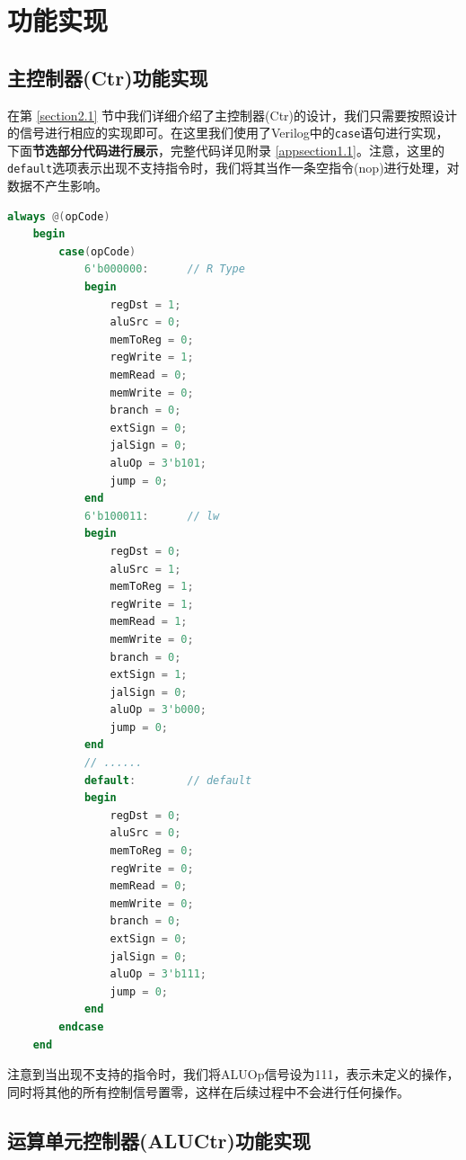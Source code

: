 \documentclass{cumcm}
\numberwithin{equation}{section}
\numberwithin{equation}{subsection}
\begin{document}
\section{功能实现}\label{section3}
\subsection{主控制器(Ctr)功能实现}\label{section3.1}

在第 \ref{section2.1} 节中我们详细介绍了主控制器(Ctr)的设计，我们只需要按照设计的信号进行相应的实现即可。在这里我们使用了Verilog中的\texttt{case}语句进行实现，下面\textbf{节选部分代码进行展示}，完整代码详见附录 \ref{appsection1.1}。注意，这里的\texttt{default}选项表示出现不支持指令时，我们将其当作一条空指令(nop)进行处理，对数据不产生影响。

\begin{lstlisting}[language=verilog]
always @(opCode)
    begin
        case(opCode)
            6'b000000:      // R Type
            begin
                regDst = 1;
                aluSrc = 0;
                memToReg = 0;
                regWrite = 1;
                memRead = 0;
                memWrite = 0;
                branch = 0;
                extSign = 0;
                jalSign = 0;
                aluOp = 3'b101;
                jump = 0;
            end
            6'b100011:      // lw
            begin
                regDst = 0;
                aluSrc = 1;
                memToReg = 1;
                regWrite = 1;
                memRead = 1;
                memWrite = 0;
                branch = 0;
                extSign = 1;
                jalSign = 0;
                aluOp = 3'b000;
                jump = 0;
            end
            // ......
            default:        // default
            begin
                regDst = 0;
                aluSrc = 0;
                memToReg = 0;
                regWrite = 0;
                memRead = 0;
                memWrite = 0;
                branch = 0;
                extSign = 0;
                jalSign = 0;
                aluOp = 3'b111;
                jump = 0;
            end
        endcase
    end
\end{lstlisting}

注意到当出现不支持的指令时，我们将ALUOp信号设为111，表示未定义的操作，同时将其他的所有控制信号置零，这样在后续过程中不会进行任何操作。

\subsection{运算单元控制器(ALUCtr)功能实现}\label{section3.2}
\end{document}
